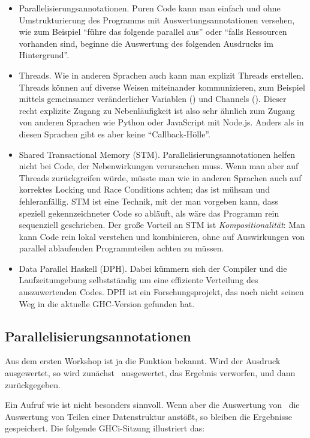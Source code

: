 \documentclass{uebblatt}
\begin{document}
\begin{itemize}
\item Parallelisierungsannotationen. Puren Code kann man einfach und ohne
Umstrukturierung des Programms mit Auswertungsannotationen versehen, wie zum
Beispiel "`führe das folgende  parallel aus"' oder "`falls
Ressourcen vorhanden sind, beginne die Auswertung des folgenden Ausdrucks im
Hintergrund"'.
\item Threads. Wie in anderen Sprachen auch kann man explizit Threads
erstellen. Threads können auf diverse Weisen miteinander kommunizieren, zum
Beispiel mittels gemeinsamer veränderlicher Variablen ()
und Channels (). Dieser recht explizite Zugang zu
Nebenläufigkeit ist also sehr ähnlich zum Zugang von anderen Sprachen wie
Python oder JavaScript mit Node.js. Anders als in diesen Sprachen gibt es aber
keine "`Callback-Hölle"'.
\item Shared Transactional Memory (STM). Parallelisierungsannotationen helfen
nicht bei Code, der Nebenwirkungen verursachen muss. Wenn man aber auf Threads
zurückgreifen würde, müsste man wie in anderen Sprachen auch auf korrektes
Locking und Race Conditions achten; das ist mühsam und fehleranfällig. STM ist
eine Technik, mit der man vorgeben kann, dass speziell gekennzeichneter Code so
abläuft, als wäre das Programm rein sequenziell geschrieben. Der große Vorteil
an STM ist \emph{Kompositionalität}: Man kann Code rein lokal verstehen und
kombinieren, ohne auf Auswirkungen von parallel ablaufenden Programmteilen
achten zu müssen.
\item Data Parallel Haskell (DPH). Dabei kümmern sich der Compiler und die
Laufzeitumgebung selbstständig um eine effiziente Verteilung des auszuwertenden
Codes. DPH ist ein Forschungsprojekt, das noch nicht seinen Weg in die
aktuelle GHC-Version gefunden hat.
\end{itemize}


\subsection{Parallelisierungsannotationen}

Aus dem ersten Workshop ist ja die Funktion 
bekannt. Wird der Ausdruck  ausgewertet, so wird
zunächst~ ausgewertet, das Ergebnis verworfen, und
dann~ zurückgegeben.

Ein Aufruf wie  ist nicht besonders sinnvoll. Wenn aber
die Auswertung von~ die Auswertung von Teilen einer
Datenstruktur anstößt, so bleiben die Ergebnisse gespeichert. Die folgende
GHCi-Sitzung illustriert das:
\end{document}
